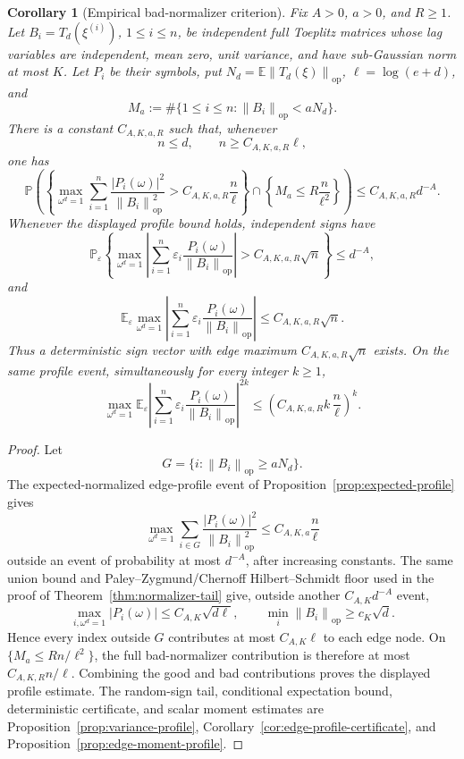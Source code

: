 \documentclass[11pt]{amsart}
\numberwithin{equation}{section}
\newtheorem{corollary}[theorem]{Corollary}
\theoremstyle{definition}
\theoremstyle{remark}
\newcommand{\op}{\mathrm{op}}
\newcommand{\Prob}{\mathbb P}
\newcommand{\Exp}{\mathbb E}
\newcommand{\norm}[1]{\left\lVert #1\right\rVert}
\newcommand{\abs}[1]{\left\lvert #1\right\rvert}
\newcommand{\eps}{\varepsilon}
\begin{document}
\begin{corollary}[Empirical bad-normalizer criterion]
\label{cor:normalizer-tail-empirical}
Fix \(A>0\), \(a>0\), and \(R\ge1\).  Let \(B_i=T_d(\xi^{(i)})\),
\(1\le i\le n\), be independent full Toeplitz matrices whose lag variables are
independent, mean zero, unit variance, and have sub-Gaussian norm at most \(K\).
Let \(P_i\) be their symbols, put \(N_d=\Exp\norm{T_d(\xi)}_{\op}\),
\(\ell=\log(e+d)\), and
\[
  M_a:=\#\{1\le i\le n:\norm{B_i}_{\op}<aN_d\}.
\]
There is a constant \(C_{A,K,a,R}\) such that, whenever
\[
  n\le d,\qquad n\ge C_{A,K,a,R}\ell ,
\]
one has
\[
  \Prob\left(
  \left\{
  \max_{\omega^d=1}
  \sum_{i=1}^n
  \frac{\abs{P_i(\omega)}^2}{\norm{B_i}_{\op}^2}
  > C_{A,K,a,R}\frac n\ell
  \right\}
  \cap
  \left\{M_a\le R\frac n{\ell^2}\right\}
  \right)
  \le C_{A,K,a,R}d^{-A}.
\]
Whenever the displayed profile bound holds, independent signs have
\[
  \Prob_\eps\left\{
  \max_{\omega^d=1}\left|\sum_{i=1}^n
  \eps_i\frac{P_i(\omega)}{\norm{B_i}_{\op}}\right|
  > C_{A,K,a,R}\sqrt n
  \right\}\le d^{-A},
\]
and
\[
  \Exp_\eps\max_{\omega^d=1}\left|\sum_{i=1}^n
  \eps_i\frac{P_i(\omega)}{\norm{B_i}_{\op}}\right|
  \le C_{A,K,a,R}\sqrt n .
\]
Thus a deterministic sign vector with edge maximum
\(C_{A,K,a,R}\sqrt n\) exists.  On the same profile event, simultaneously for
every integer \(k\ge1\),
\[
  \max_{\omega^d=1}
  \Exp_\eps\left|\sum_{i=1}^n
  \eps_i\frac{P_i(\omega)}{\norm{B_i}_{\op}}\right|^{2k}
  \le
  \left(C_{A,K,a,R}k\,\frac n\ell\right)^k .
\]
\end{corollary}

\begin{proof}
Let
\[
  G=\{i:\norm{B_i}_{\op}\ge aN_d\}.
\]
The expected-normalized edge-profile event of
Proposition~\ref{prop:expected-profile} gives
\[
  \max_{\omega^d=1}\sum_{i\in G}
  \frac{\abs{P_i(\omega)}^2}{\norm{B_i}_{\op}^2}
  \le C_{A,K,a}\frac n\ell
\]
outside an event of probability at most \(d^{-A}\), after increasing constants.
The same union bound and Paley--Zygmund/Chernoff Hilbert--Schmidt floor used in
the proof of Theorem~\ref{thm:normalizer-tail} give, outside another
\(C_{A,K}d^{-A}\) event,
\[
  \max_{i,\omega^d=1}\abs{P_i(\omega)}\le C_{A,K}\sqrt{d\ell},
  \qquad
  \min_i\norm{B_i}_{\op}\ge c_K\sqrt d .
\]
Hence every index outside \(G\) contributes at most \(C_{A,K}\ell\) to each
edge node.  On \(\{M_a\le Rn/\ell^2\}\), the full bad-normalizer contribution is
therefore at most \(C_{A,K,R}n/\ell\).  Combining the good and bad contributions
proves the displayed profile estimate.  The random-sign tail, conditional
expectation bound, deterministic certificate, and scalar moment estimates are
Proposition~\ref{prop:variance-profile},
Corollary~\ref{cor:edge-profile-certificate}, and
Proposition~\ref{prop:edge-moment-profile}.
\end{proof}
\end{document}
